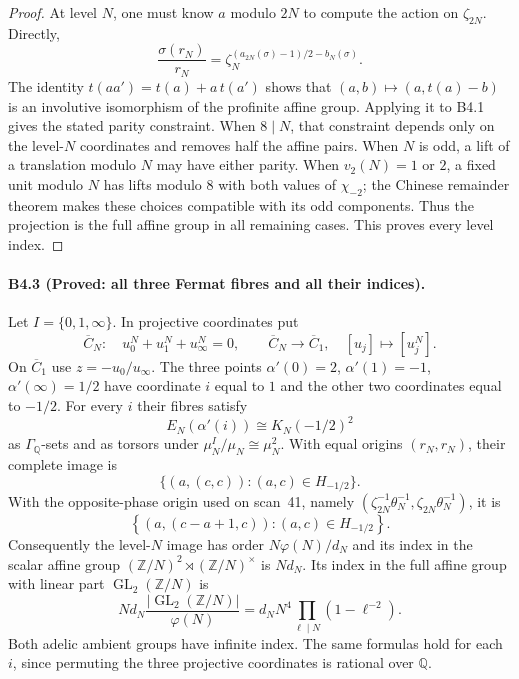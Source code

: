 \begin{proof}
At level $N$, one must know $a$ modulo $2N$ to compute the action on
$\zeta_{2N}$. Directly,
\[
 \frac{\sigma(r_N)}{r_N}
 =\zeta_N^{(a_{2N}(\sigma)-1)/2-b_N(\sigma)}.
\]
The identity $t(aa')=t(a)+a\,t(a')$ shows that
$(a,b)\mapsto(a,t(a)-b)$ is an involutive isomorphism of the profinite
affine group. Applying it to B4.1 gives the stated parity constraint.
When $8\mid N$, that constraint depends only on the level-$N$
coordinates and removes half the affine pairs. When $N$ is odd, a lift
of a translation modulo $N$ may have either parity. When $v_2(N)=1$
or $2$, a fixed unit modulo $N$ has lifts modulo $8$ with both values
of $\chi_{-2}$; the Chinese remainder theorem makes these choices
compatible with its odd components. Thus the projection is the full
affine group in all remaining cases. This proves every level index.
\end{proof}

\paragraph{B4.3 (Proved: all three Fermat fibres and all their indices).}
\label{B4.3}
Let $I=\{0,1,\infty\}$. In projective coordinates put
\[
 \overline C_N:\quad u_0^N+u_1^N+u_\infty^N=0,
 \qquad
 \overline C_N\longrightarrow\overline C_1,
 \quad [u_j]\longmapsto[u_j^N].
\]
On $\overline C_1$ use $z=-u_0/u_\infty$. The three points
$\alpha'(0)=2$, $\alpha'(1)=-1$, $\alpha'(\infty)=1/2$ have coordinate
$i$ equal to $1$ and the other two coordinates equal to $-1/2$.
For every $i$ their fibres satisfy
\[
 E_N(\alpha'(i))\cong K_N(-1/2)^2
\]
as $\Gamma_{\mathbb Q}$-sets and as torsors under
$\mu_N^I/\mu_N\cong\mu_N^2$.
With equal origins $(r_N,r_N)$, their complete image is
\[
 \{(a,(c,c)):(a,c)\in H_{-1/2}\}.
\]
With the opposite-phase origin used on scan~41, namely
$(\zeta_{2N}^{-1}\theta_N^{-1},\zeta_{2N}\theta_N^{-1})$,
it is
\[
 \left\{(a,(c-a+1,c)):(a,c)\in H_{-1/2}\right\}.
\]
Consequently the level-$N$ image has order $N\varphi(N)/d_N$ and its
index in the scalar affine group
$(\mathbb Z/N)^2\rtimes(\mathbb Z/N)^\times$ is $Nd_N$.
Its index in the full affine group with linear part
$\operatorname{GL}_2(\mathbb Z/N)$ is
\[
 Nd_N\frac{|\operatorname{GL}_2(\mathbb Z/N)|}{\varphi(N)}
 =d_NN^4\prod_{\ell\mid N}(1-\ell^{-2}).
\]
Both adelic ambient groups have infinite index. The same formulas hold
for each $i$, since permuting the three projective coordinates is
rational over $\mathbb Q$.

